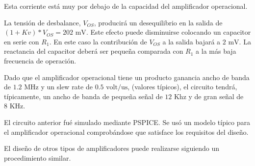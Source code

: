 Esta corriente está muy por debajo de la capacidad del amplificador operacional.

La tensión de desbalance, $V_{OS}$, producirá un desequilibrio en la salida de $(1 + Kv) * V_{OS} = 202\text{ mV}$. Este efecto puede disminuirse colocando un capacitor en serie con $R_1$. En este caso la contribución de $V_{OS}$ a la salida bajará a $2\text{ mV}$. La reactancia del capacitor deberá ser pequeña comparada con $R_1$ a la más baja frecuencia de operación.

Dado que el amplificador operacional tiene un producto ganancia ancho de banda de $1.2\text{ MHz}$ y un slew rate de $0.5\text{ volt/us}$, (valores típicos), el circuito tendrá, típicamente, un ancho de banda de pequeña señal de $12\text{ Khz}$ y de gran señal de $8\text{ KHz}$.

El circuito anterior fué simulado mediante PSPICE. Se usó un modelo típico para el amplificador operacional comprobándose que satisface los requisitos del diseño.

El diseño de otros tipos de amplificadores puede realizarse siguiendo un procedimiento similar.